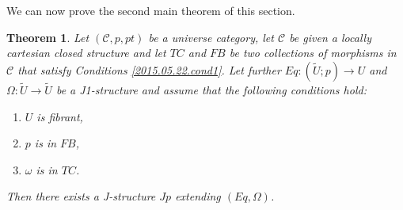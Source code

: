 \documentclass[12pt]{article}
\newtheorem{theorem}[proposition]{Theorem}
\newcommand{\llabel}[1]{\label{#1}}
\newcommand{\sr}{\rightarrow}
\newcommand{\wt}{\widetilde}
\begin{document}
%















We can now prove the second main theorem of this section.
%
\begin{theorem}
\llabel{2015.05.16.th1}
Let $({\mathcal C},p,pt)$ be a universe category, let $\mathcal C$ be given a locally cartesian closed structure and let $TC$ and $FB$ be two collections of morphisms in $\mathcal C$ that satisfy Conditions \ref{2015.05.22.cond1}. Let further $Eq:(\wt{U};p)\sr U$ and $\Omega:\wt{U}\sr \wt{U}$ be a J1-structure and assume that the following conditions hold:
%
\begin{enumerate}
\item $U$ is fibrant,
\item $p$ is in $FB$,
\item $\omega$ is in $TC$.
\end{enumerate}
%
Then there exists a J-structure $Jp$ extending $(Eq,\Omega)$.
\end{theorem}
%
\end{document}
